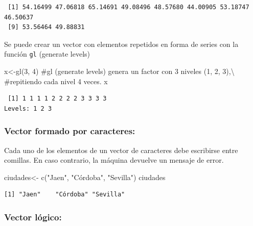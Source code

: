 \documentclass[
  letterpaper,
]{scrbook}
\newenvironment{Shaded}{\begin{snugshade}}{\end{snugshade}}
\newcommand{\CommentTok}[1]{\textcolor[rgb]{0.37,0.37,0.37}{#1}}
\newcommand{\DecValTok}[1]{\textcolor[rgb]{0.68,0.00,0.00}{#1}}
\newcommand{\FunctionTok}[1]{\textcolor[rgb]{0.28,0.35,0.67}{#1}}
\newcommand{\NormalTok}[1]{\textcolor[rgb]{0.00,0.23,0.31}{#1}}
\newcommand{\OtherTok}[1]{\textcolor[rgb]{0.00,0.23,0.31}{#1}}
\newcommand{\StringTok}[1]{\textcolor[rgb]{0.13,0.47,0.30}{#1}}
\begin{document}
\begin{verbatim}
 [1] 54.16499 47.06818 65.14691 49.08496 48.57680 44.00905 53.18747 46.50637
 [9] 53.56464 49.88831
\end{verbatim}

Se puede crear un vector con elementos repetidos en forma de series con
la función \texttt{gl} (generate levels)

\begin{Shaded}
\begin{Highlighting}[]
\NormalTok{x}\OtherTok{\textless{}{-}}\FunctionTok{gl}\NormalTok{(}\DecValTok{3}\NormalTok{, }\DecValTok{4}\NormalTok{) }\CommentTok{\#gl (generate levels) genera un factor con 3 niveles (1, 2, 3),\textbackslash{}}
\CommentTok{\#repitiendo cada nivel 4 veces. }
\NormalTok{x }
\end{Highlighting}
\end{Shaded}

\begin{verbatim}
 [1] 1 1 1 1 2 2 2 2 3 3 3 3
Levels: 1 2 3
\end{verbatim}

\hypertarget{vector-formado-por-caracteres}{%
\subsubsection{Vector formado por
caracteres:}\label{vector-formado-por-caracteres}}

Cada uno de los elementos de un vector de caracteres debe escribirse
entre comillas. En caso contrario, la máquina devuelve un mensaje de
error.

\begin{Shaded}
\begin{Highlighting}[]
\NormalTok{ciudades}\OtherTok{\textless{}{-}} \FunctionTok{c}\NormalTok{(}\StringTok{"Jaen"}\NormalTok{, }\StringTok{"Córdoba"}\NormalTok{, }\StringTok{"Sevilla"}\NormalTok{)}
\NormalTok{ciudades}
\end{Highlighting}
\end{Shaded}

\begin{verbatim}
[1] "Jaen"    "Córdoba" "Sevilla"
\end{verbatim}

\hypertarget{vector-luxf3gico}{%
\subsubsection{Vector lógico:}\label{vector-luxf3gico}}
\end{document}
